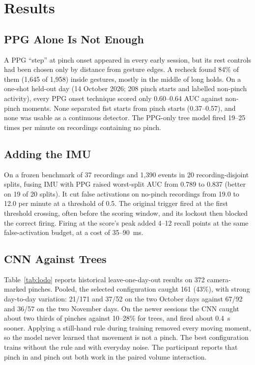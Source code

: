 \section{Results}

\subsection{PPG Alone Is Not Enough}

A PPG ``step'' at pinch onset appeared in every early session, but its rest controls had been chosen only by distance from gesture edges. A recheck found 84\% of them (1{,}645 of 1{,}958) inside gestures, mostly in the middle of long holds. On a one-shot held-out day (14 October 2026; 208 pinch starts and labelled non-pinch activity), every PPG onset technique scored only 0.60--0.64 AUC against non-pinch moments. None separated fist starts from pinch starts (0.37--0.57), and none was usable as a continuous detector. The PPG-only tree model fired 19--25 times per minute on recordings containing no pinch.

\subsection{Adding the IMU}

On a frozen benchmark of 37 recordings and 1{,}390 events in 20 recording-disjoint splits, fusing IMU with PPG raised worst-split AUC from 0.789 to 0.837 (better on 19 of 20 splits). It cut false activations on no-pinch recordings from 19.0 to 12.0 per minute at a threshold of 0.5. The original trigger fired at the first threshold crossing, often before the scoring window, and its lockout then blocked the correct firing. Firing at the score's peak added 4--12 recall points at the same false-activation budget, at a cost of 35--90~ms.

\subsection{CNN Against Trees}

Table~\ref{tab:lodo} reports historical leave-one-day-out results on 372 camera-marked pinches. Pooled, the selected configuration caught 161 (43\%), with strong day-to-day variation: 21/171 and 37/52 on the two October days against 67/92 and 36/57 on the two November days. On the newer sessions the CNN caught about two thirds of pinches against 10--28\% for trees, and fired about 0.4~s sooner. Applying a still-hand rule during training removed every moving moment, so the model never learned that movement is not a pinch. The best configuration trains without the rule and with everyday noise. The participant reports that pinch in and pinch out both work in the paired volume interaction.


